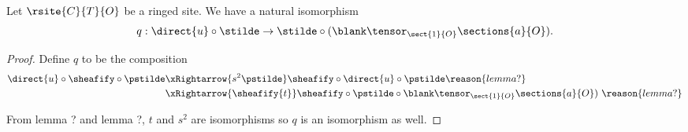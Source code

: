 \begin{lemma}
Let $\rsite{C}{T}{O}$ be a ringed site.
We have a natural isomorphism  
\[q:\direct{u} \circ \stilde \rightarrow \stilde \circ (\blank \tensor_{\sect{1}{O}} \sections{a}{O}).\]
\end{lemma}

\begin{proof}
Define $q$ to be the composition
\begin{align*}
	\direct{u} \circ \sheafify \circ \pstilde 
	& \xRightarrow{s^2\pstilde} \sheafify \circ \direct{u} \circ \pstilde \reason{lemma ?}\\
	& \xRightarrow{\sheafify{t}} \sheafify \circ \pstilde \circ \blank \tensor_{\sect{1}{O}} \sections{a}{O})\ \reason{lemma ?}
\end{align*}

From lemma ? and lemma ?, $t$ and $s^2$ are isomorphisms so $q$ is an isomorphism as well.
\end{proof}






